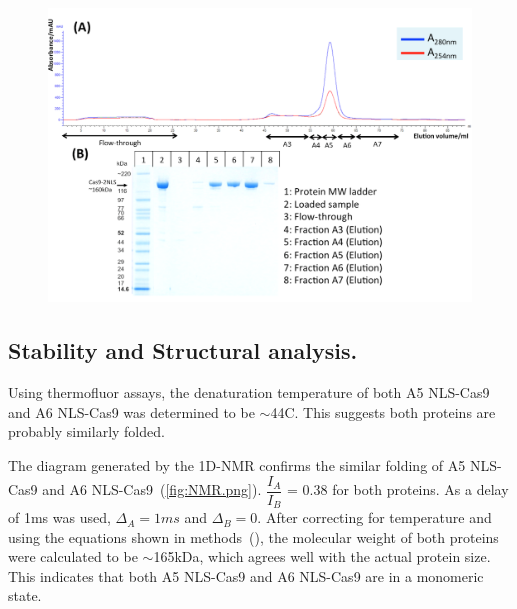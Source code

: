 \documentclass[11pt]{article}
\begin{document}
\begin{figure}[H]
  \centering
    \includegraphics[width=\textwidth]{Cas9-2NLS_IEX.png}
    \label{fig:Cas9-2NLS_IEX.png}
\end{figure}

\subsection{Stability and Structural analysis.}
Using thermofluor assays, the denaturation temperature of both A5 NLS-Cas9 and A6 NLS-Cas9 was determined to be $\sim$44\degree C. This suggests both proteins are probably similarly folded.

The diagram generated by the 1D-NMR confirms the similar folding of A5 NLS-Cas9 and A6 NLS-Cas9~(\autoref{fig:NMR.png}). $\dfrac{I_{A}}{I_{B}}$ = 0.38 for both proteins. As a delay of 1ms was used, $\Delta_A = 1ms$ and $\Delta_B = 0$. After correcting for temperature and using the equations shown in methods~(), the molecular weight of both proteins were calculated to be $\sim$165kDa, which agrees well with the actual protein size. This indicates that both A5 NLS-Cas9 and A6 NLS-Cas9 are in a monomeric state.
\end{document}
